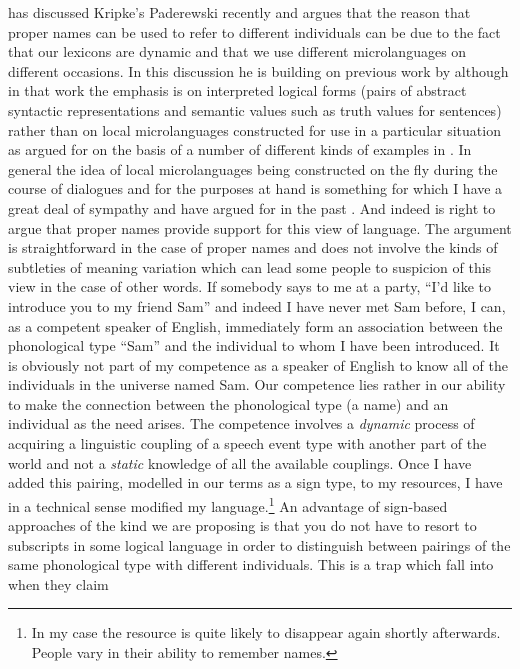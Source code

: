 \cite{Ludlow2014} has discussed Kripke's Paderewski recently and
argues that the reason that proper names can be used to refer to
different individuals can be due to the fact that our lexicons are
dynamic and that we use different microlanguages on different
occasions.  In this discussion he is building on previous work by
\cite{LarsonLudlow1993} although in that work the emphasis is on
interpreted logical forms (pairs of abstract syntactic representations
and semantic values such as truth values for sentences) rather than on
local microlanguages constructed for use in a particular situation as
argued for on the basis of a number of different kinds of examples in
\cite{Ludlow2014}.  In general the idea of local microlanguages being
constructed on the fly during the course of dialogues and for the
purposes at hand is something for which I have a great deal of
sympathy and have argued for in the past
\citep{CooperRanta2008,LarssonCooper2009,Cooper2010,Cooper2012}.  And
indeed \cite{Ludlow2014} is right to argue that proper names provide
support for this view of language.  The argument is straightforward in
the case of proper names and does not involve the kinds of subtleties
of meaning variation which can lead some people to suspicion of this view in the
case of other words. If somebody says to me at a party, ``I'd like to
introduce you to my friend Sam'' and indeed I have never met Sam
before, I can, as a competent speaker of English, immediately form an
association between the phonological type ``Sam'' and the individual
to whom I have been introduced.  It is obviously not part of my
competence as a speaker of English to know all of the individuals in
the universe named Sam.  Our competence lies rather in our ability to
make the connection between the phonological type (a name) and an
individual as the need arises.  The competence involves a
\textit{dynamic} process of acquiring a linguistic coupling of a
speech event type with another part of the world and not a \textit{static}
knowledge of all the available couplings.  Once I have added this
pairing, modelled in our terms as a sign type, to my resources, I have in a technical
sense modified my language.\footnote{In my case the resource is quite
  likely to disappear again shortly afterwards.  People vary in their
  ability to remember names.}  An advantage of sign-based approaches of
the kind we are proposing is that you do not have to resort to
subscripts in some logical language in order to distinguish between
pairings of the same phonological type with different individuals.
This is a trap which \cite{LarsonLudlow1993} fall into when they claim
